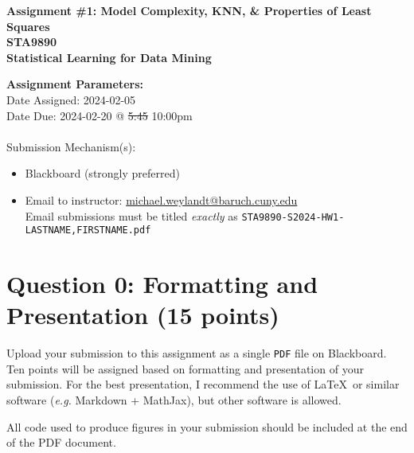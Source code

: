 \documentclass[10pt]{article}
\begin{document}
\begin{center}
    {\Large \bf Assignment \#1: Model Complexity, KNN, \& Properties of Least Squares \\ STA9890 \\ Statistical Learning for Data Mining}
\end{center}

{\bf Assignment Parameters:} \\
\phantom{abc}Date Assigned: 2024-02-05\\
\phantom{abc}Date Due: 2024-02-20 @ \st{5:45} 10:00pm \\
~\\
\phantom{abc}Submission Mechanism(s):
\begin{itemize}
    \item Blackboard (strongly preferred)
    \item Email to instructor: \href{mailto:michael.weylandt@baruch.cuny.edu}{michael.weylandt@baruch.cuny.edu} \\ 
    {\small Email submissions must be titled \emph{exactly} as \texttt{STA9890-S2024-HW1-LASTNAME,FIRSTNAME.pdf}}
\end{itemize}

\section*{Question 0: Formatting and Presentation (15 points)}
Upload your submission to this assignment as a single \texttt{PDF} file on Blackboard. Ten points will be assigned based on formatting and presentation of your submission. For the best presentation, I recommend the use of \LaTeX\ or similar software (\emph{e.g.} Markdown + MathJax), but other software is allowed. 

All code used to produce figures in your submission should be included at the end of the PDF document.
\end{document}
